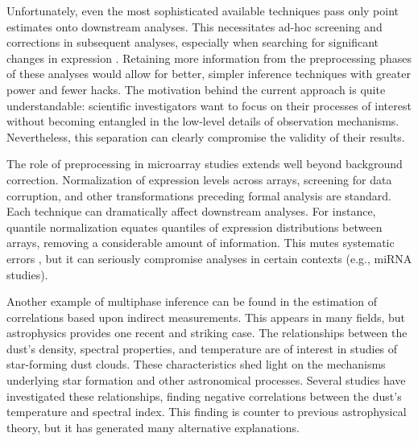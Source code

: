 Unfortunately, even the most sophisticated available techniques pass only point estimates onto downstream analyses.
This necessitates ad-hoc screening and corrections in subsequent analyses, especially when searching for significant changes in expression \citep[e.g.,][]{Tusher2001}.
Retaining more information from the preprocessing phases of these analyses would allow for better, simpler inference techniques with greater power and fewer hacks.
The motivation behind the current approach is quite understandable: scientific investigators want to focus on their processes of interest without becoming entangled in the low-level details of observation mechanisms.
Nevertheless, this separation can clearly compromise the validity of their results.

The role of preprocessing in microarray studies extends well beyond background correction.
Normalization of expression levels across arrays, screening for data corruption, and other transformations preceding formal analysis are standard.
Each technique can dramatically affect downstream analyses.
For instance, quantile normalization equates quantiles of expression distributions between arrays, removing a considerable amount of information.
This mutes systematic errors \citep{Bolstad2003}, but it can seriously compromise analyses in certain contexts (e.g., miRNA studies).

Another example of multiphase inference can be found in the estimation of correlations based upon indirect measurements.
This appears in many fields, but astrophysics provides one recent and striking case.
The relationships between the dust's density, spectral properties, and temperature are of interest in studies of star-forming dust clouds.
These characteristics shed light on the mechanisms underlying star formation and other astronomical processes.
Several studies \citep[e.g.,][]{Dupac2003,Desert2008,Anderson2010,Paradis2010} have investigated these relationships, finding negative correlations between the dust's temperature and spectral index.
This finding is counter to previous astrophysical theory, but it has generated  many alternative explanations.

